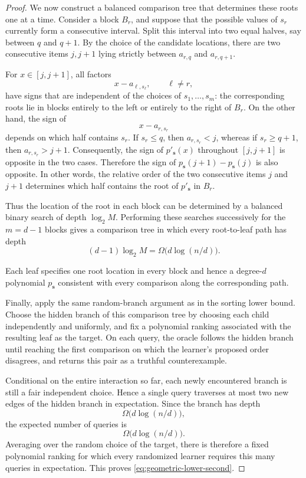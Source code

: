 \documentclass[11pt]{article}
\theoremstyle{definition}
\theoremstyle{remark}
\begin{document}
\begin{proof}
We now construct a balanced comparison tree that determines these roots one
at a time. Consider a block $B_r$, and suppose that the possible values of
$s_r$ currently form a consecutive interval. Split this interval into two
equal halves, say between $q$ and $q+1$. By the choice of the candidate
locations, there are two consecutive items $j,j+1$ lying strictly between
$a_{r,q}$ and $a_{r,q+1}$.

For $x\in[j,j+1]$, all factors
\[
    x-a_{\ell,s_\ell},
    \qquad \ell\neq r,
\]
have signs that are independent of the choices of
$s_1,\ldots,s_m$: the corresponding roots lie in blocks entirely to the
left or entirely to the right of $B_r$. On the other hand, the sign of
\[
    x-a_{r,s_r}
\]
depends on which half contains $s_r$. If $s_r\leq q$, then
$a_{r,s_r}<j$, whereas if $s_r\geq q+1$, then
$a_{r,s_r}>j+1$. Consequently, the sign of
$p'_{\mathbf{s}}(x)$ throughout $[j,j+1]$ is opposite in the two cases.
Therefore the sign of
\(p_{\mathbf{s}}(j+1)-p_{\mathbf{s}}(j)\)
is also opposite. In other words, the relative order of the two consecutive
items $j$ and $j+1$ determines which half contains the root of
$p'_{\mathbf{s}}$ in $B_r$.

Thus the location of the root in each block can be determined by a balanced
binary search of depth $\log_2 M$. Performing these searches successively
for the $m=d-1$ blocks gives a comparison tree in which every
root-to-leaf path has depth
\[
    (d-1)\log_2 M
    =
    \Omega\bigl(d\log(n/d)\bigr).
\]

Each leaf specifies one root location in every block and hence a degree-$d$
polynomial $p_{\mathbf{s}}$ consistent with every comparison along the
corresponding path. 

Finally, apply the same random-branch argument as in the sorting lower
bound. Choose the hidden branch of this comparison tree by choosing each
child independently and uniformly, and fix a polynomial ranking associated
with the resulting leaf as the target. On each query, the oracle follows
the hidden branch until reaching the first comparison on which the
learner's proposed order disagrees, and returns this pair as a truthful
counterexample.

Conditional on the entire interaction so far, each newly encountered branch
is still a fair independent choice. Hence a single query traverses at most
two new edges of the hidden branch in expectation. Since the branch has
depth
\[
    \Omega\bigl(d\log(n/d)\bigr),
\]
the expected number of queries is
\[
    \Omega\bigl(d\log(n/d)\bigr).
\]
Averaging over the random choice of the target, there is therefore a fixed
polynomial ranking for which every randomized learner requires this many
queries in expectation. This proves
\eqref{eq:geometric-lower-second}.
\end{proof}
\end{document}
